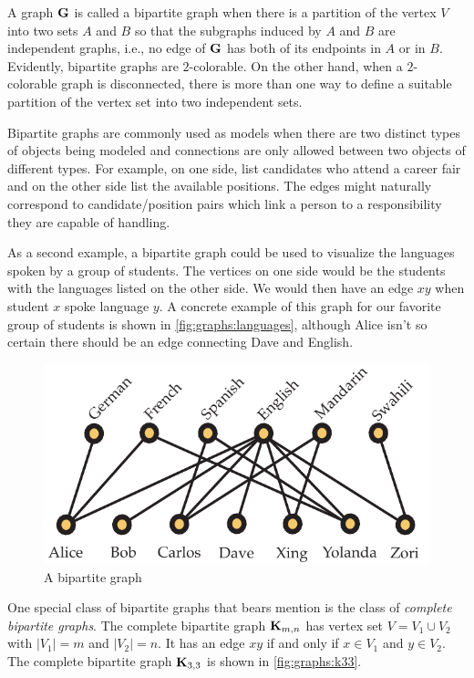 A graph $\mathbf{G}$ is called a bipartite graph when there is
a partition of the vertex $V$ into two sets $A$ and $B$ 
so that the subgraphs induced by $A$ and $B$ are independent graphs, 
i.e., no edge of $\mathbf{G}$ has both of its endpoints in $A$ or in $B$. 
Evidently, bipartite graphs are $2$-colorable.  On the other hand,
when a $2$-colorable graph is disconnected, there is more than
one way to define a suitable partition of the vertex set into
two independent sets.

Bipartite graphs are commonly used as models when there are two
distinct types of objects being modeled and connections are only
allowed between two objects of different types.  For example,
on one side, list candidates who attend a career fair and on the
other side list the available positions.  The edges might naturally
correspond to candidate/position pairs which link a person to
a responsibility they are capable of handling.

As a second example, a
bipartite graph could be used to visualize the languages spoken by a
group of students. The vertices on one side would be the students with the
languages listed on the other side.  We would then have an edge $xy$ when
student $x$ spoke language $y$.
A concrete example of this graph for our favorite group of students is
shown in \autoref{fig:graphs:languages}, although Alice isn't so
certain there should be an edge connecting Dave and English.

\begin{figure}[b]
  \centering
  \includegraphics[scale=0.63]{graphs-figs/languages}
  \caption{A bipartite graph}
  \label{fig:graphs:languages}
\end{figure}

One special class of bipartite graphs that bears mention is the class
of \emph{complete bipartite graphs}. The complete bipartite graph
$\mathbf{K}_{m,n}$ has vertex set $V=V_1\cup V_2$ with $|V_1|=m$ and
$|V_2|=n$. It has an edge $xy$ if and only if $x\in V_1$ and $y\in
V_2$. The complete bipartite graph $\mathbf{K}_{3,3}$ is shown in \autoref{fig:graphs:k33}.

